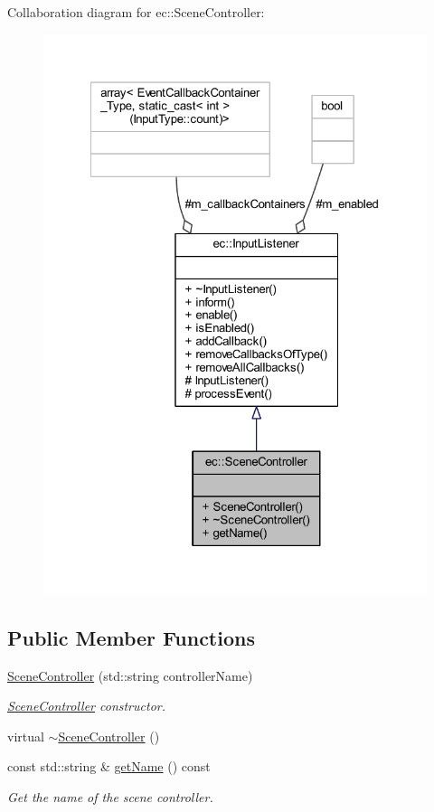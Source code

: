 Collaboration diagram for ec\+:\+:Scene\+Controller\+:\nopagebreak
\begin{figure}[H]
\begin{center}
\leavevmode
\includegraphics[width=322pt]{classec_1_1_scene_controller__coll__graph}
\end{center}
\end{figure}
\subsection*{Public Member Functions}
\begin{DoxyCompactItemize}
\item 
\mbox{\hyperlink{classec_1_1_scene_controller_a97313b71165471f26f6e1bdec16392fd}{Scene\+Controller}} (std\+::string controller\+Name)
\begin{DoxyCompactList}\small\item\em \mbox{\hyperlink{classec_1_1_scene_controller}{Scene\+Controller}} constructor. \end{DoxyCompactList}\item 
virtual \mbox{\hyperlink{classec_1_1_scene_controller_a48a2231bf316949cc1a8bc304ad5281c}{$\sim$\+Scene\+Controller}} ()
\item 
const std\+::string \& \mbox{\hyperlink{classec_1_1_scene_controller_af45d2fce41110dc9a128b900bde8ba14}{get\+Name}} () const
\begin{DoxyCompactList}\small\item\em Get the name of the scene controller. \end{DoxyCompactList}\end{DoxyCompactItemize}
